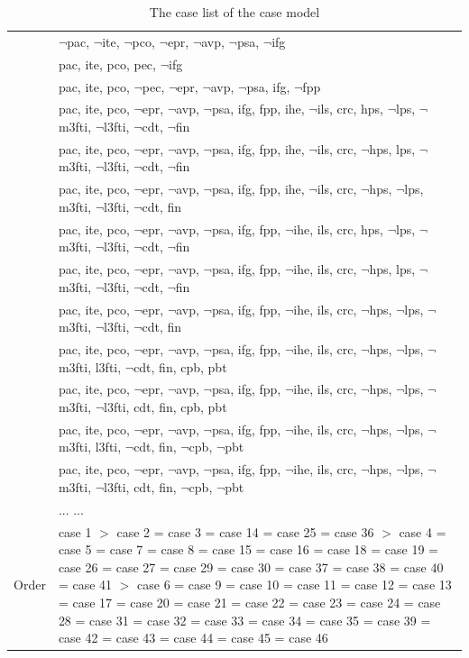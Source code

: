\documentclass{IOS-Book-Article}
\begin{document}
\footnotesize
\begin{table}[htb]
\caption{The case list of the case model}
\centering
\begin{tabularx}{120mm}{>{\hsize=0.1\hsize}X>{\hsize=1.6\hsize}X}
\hline
1	& $\neg$pac, $\neg$ite, $\neg$pco, $\neg$epr, $\neg$avp, $\neg$psa, $\neg$ifg \\
2	& pac, ite, pco, pec, $\neg$ifg \\
3	& pac, ite, pco, $\neg$pec, $\neg$epr, $\neg$avp, $\neg$psa, ifg, $\neg$fpp \\
4	& pac, ite, pco, $\neg$epr, $\neg$avp, $\neg$psa, ifg, fpp, ihe, $\neg$ils, crc, hps, $\neg$lps, $\neg$m3fti, $\neg$l3fti, $\neg$cdt, $\neg$fin \\
5	& pac, ite, pco, $\neg$epr, $\neg$avp, $\neg$psa, ifg, fpp, ihe, $\neg$ils, crc, $\neg$hps, lps, $\neg$m3fti, $\neg$l3fti, $\neg$cdt, $\neg$fin \\
6	& pac, ite, pco, $\neg$epr, $\neg$avp, $\neg$psa, ifg, fpp, ihe, $\neg$ils, crc, $\neg$hps, $\neg$lps, m3fti, $\neg$l3fti, $\neg$cdt, fin \\
7	& pac, ite, pco, $\neg$epr, $\neg$avp, $\neg$psa, ifg, fpp, $\neg$ihe, ils, crc, hps, $\neg$lps, $\neg$m3fti, $\neg$l3fti, $\neg$cdt, $\neg$fin \\
8	& pac, ite, pco, $\neg$epr, $\neg$avp, $\neg$psa, ifg, fpp, $\neg$ihe, ils, crc, $\neg$hps, lps, $\neg$m3fti, $\neg$l3fti, $\neg$cdt, $\neg$fin \\
9	& pac, ite, pco, $\neg$epr, $\neg$avp, $\neg$psa, ifg, fpp, $\neg$ihe, ils, crc, $\neg$hps, $\neg$lps, $\neg$m3fti, $\neg$l3fti, $\neg$cdt, fin \\
10	& pac, ite, pco, $\neg$epr, $\neg$avp, $\neg$psa, ifg, fpp, $\neg$ihe, ils, crc, $\neg$hps, $\neg$lps, $\neg$m3fti, l3fti, $\neg$cdt, fin, cpb, pbt \\
11	& pac, ite, pco, $\neg$epr, $\neg$avp, $\neg$psa, ifg, fpp, $\neg$ihe, ils, crc, $\neg$hps, $\neg$lps, $\neg$m3fti, $\neg$l3fti, cdt, fin, cpb, pbt \\
12	& pac, ite, pco, $\neg$epr, $\neg$avp, $\neg$psa, ifg, fpp, $\neg$ihe, ils, crc, $\neg$hps, $\neg$lps, $\neg$m3fti, l3fti, $\neg$cdt, fin, $\neg$cpb, $\neg$pbt \\
13	& pac, ite, pco, $\neg$epr, $\neg$avp, $\neg$psa, ifg, fpp, $\neg$ihe, ils, crc, $\neg$hps, $\neg$lps, $\neg$m3fti, $\neg$l3fti, cdt, fin, $\neg$cpb, $\neg$pbt \\
14	& ... ... \\ 
\hline
Order & case 1 $>$ case 2 = case 3 = case 14 = case 25 = case 36 $>$ case 4 = case 5 = case 7 = case 8 = case 15 = case 16 = case 18 = case 19 = case 26 = case 27 = case 29 = case 30 = case 37 = case 38 = case 40 = case 41 $>$ case 6 = case 9 = case 10 = case 11 = case 12 = case 13 = case 17 = case 20 = case 21 = case 22 = case 23 = case 24 = case 28 = case 31 = case 32 = case 33 = case 34 = case 35 = case 39 = case 42 = case 43 = case 44 = case 45 = case 46\\
\hline
\end{tabularx}
\end{table}
\end{document}

